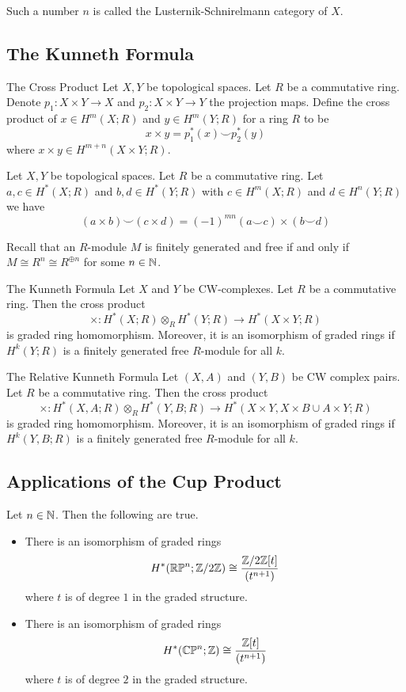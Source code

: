 \documentclass[a4paper]{article}
\begin{document}
Such a number $n$ is called the Lusternik-Schnirelmann category of $X$. 

\subsection{The Kunneth Formula}
\begin{defn}{The Cross Product}{} Let $X,Y$ be topological spaces. Let $R$ be a commutative ring. Denote $p_1:X\times Y\to X$ and $p_2:X\times Y\to Y$ the projection maps. Define the cross product of $x\in H^m(X;R)$ and $y\in H^m(Y;R)$ for a ring $R$ to be $$x\times y=p_1^\ast(x)\smile p_2^\ast(y)$$ where $x\times y\in H^{m+n}(X\times Y;R)$. 
\end{defn}

\begin{prp}{}{} Let $X,Y$ be topological spaces. Let $R$ be a commutative ring. Let $a,c\in H^\ast(X;R)$ and $b,d\in H^\ast(Y;R)$ with $c\in H^m(X;R)$ and $d\in H^n(Y;R)$ we have $$(a\times b)\smile(c\times d)=(-1)^{mn}(a\smile c)\times(b\smile d)$$
\end{prp}

Recall that an $R$-module $M$ is finitely generated and free if and only if $M\cong R^n\cong R^{\oplus n}$ for some $n\in\mathbb{N}$. 

\begin{thm}{The Kunneth Formula}{} Let $X$ and $Y$ be CW-complexes. Let $R$ be a commutative ring. Then the cross product $$\times:H^\ast(X;R)\otimes_R H^\ast(Y;R)\to H^\ast(X\times Y;R)$$ is graded ring homomorphism. Moreover, it is an isomorphism of graded rings if $H^k(Y;R)$ is a finitely generated free $R$-module for all $k$. 
\end{thm}

\begin{thm}{The Relative Kunneth Formula}{} Let $(X,A)$ and $(Y,B)$ be CW complex pairs. Let $R$ be a commutative ring. Then the cross product $$\times:H^\ast(X,A;R)\otimes_R H^\ast(Y,B;R)\to H^\ast(X\times Y,X\times B\cup A\times Y;R)$$ is graded ring homomorphism. Moreover, it is an isomorphism of graded rings if $H^k(Y,B;R)$ is a finitely generated free $R$-module for all $k$. 
\end{thm}

\subsection{Applications of the Cup Product}
\begin{prp}{}{} Let $n\in\mathbb{N}$. Then the following are true. 
\begin{itemize}
\item There is an isomorphism of graded rings $$H^\ast(\mathbb{R}\mathbb{P}^n;\mathbb{Z}/2\mathbb{Z})\cong\frac{\mathbb{Z}/2\mathbb{Z}[t]}{(t^{n+1})}$$ where $t$ is of degree $1$ in the graded structure. 
\item There is an isomorphism of graded rings $$H^\ast(\mathbb{C}\mathbb{P}^n;\mathbb{Z})\cong\frac{\mathbb{Z}[t]}{(t^{n+1})}$$ where $t$ is of degree $2$ in the graded structure. 
\end{itemize}
\end{prp}
\end{document}
